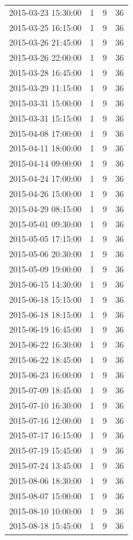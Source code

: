 \begin{tabular}{lrrr}
2015-03-23 15:30:00 & 1 & 9 & 36 \\
2015-03-25 16:15:00 & 1 & 9 & 36 \\
2015-03-26 21:45:00 & 1 & 9 & 36 \\
2015-03-26 22:00:00 & 1 & 9 & 36 \\
2015-03-28 16:45:00 & 1 & 9 & 36 \\
2015-03-29 11:15:00 & 1 & 9 & 36 \\
2015-03-31 15:00:00 & 1 & 9 & 36 \\
2015-03-31 15:15:00 & 1 & 9 & 36 \\
2015-04-08 17:00:00 & 1 & 9 & 36 \\
2015-04-11 18:00:00 & 1 & 9 & 36 \\
2015-04-14 09:00:00 & 1 & 9 & 36 \\
2015-04-24 17:00:00 & 1 & 9 & 36 \\
2015-04-26 15:00:00 & 1 & 9 & 36 \\
2015-04-29 08:15:00 & 1 & 9 & 36 \\
2015-05-01 09:30:00 & 1 & 9 & 36 \\
2015-05-05 17:15:00 & 1 & 9 & 36 \\
2015-05-06 20:30:00 & 1 & 9 & 36 \\
2015-05-09 19:00:00 & 1 & 9 & 36 \\
2015-06-15 14:30:00 & 1 & 9 & 36 \\
2015-06-18 15:15:00 & 1 & 9 & 36 \\
2015-06-18 18:15:00 & 1 & 9 & 36 \\
2015-06-19 16:45:00 & 1 & 9 & 36 \\
2015-06-22 16:30:00 & 1 & 9 & 36 \\
2015-06-22 18:45:00 & 1 & 9 & 36 \\
2015-06-23 16:00:00 & 1 & 9 & 36 \\
2015-07-09 18:45:00 & 1 & 9 & 36 \\
2015-07-10 16:30:00 & 1 & 9 & 36 \\
2015-07-16 12:00:00 & 1 & 9 & 36 \\
2015-07-17 16:15:00 & 1 & 9 & 36 \\
2015-07-19 15:45:00 & 1 & 9 & 36 \\
2015-07-24 13:45:00 & 1 & 9 & 36 \\
2015-08-06 18:30:00 & 1 & 9 & 36 \\
2015-08-07 15:00:00 & 1 & 9 & 36 \\
2015-08-10 10:00:00 & 1 & 9 & 36 \\
2015-08-18 15:45:00 & 1 & 9 & 36 \\

\end{tabular}
